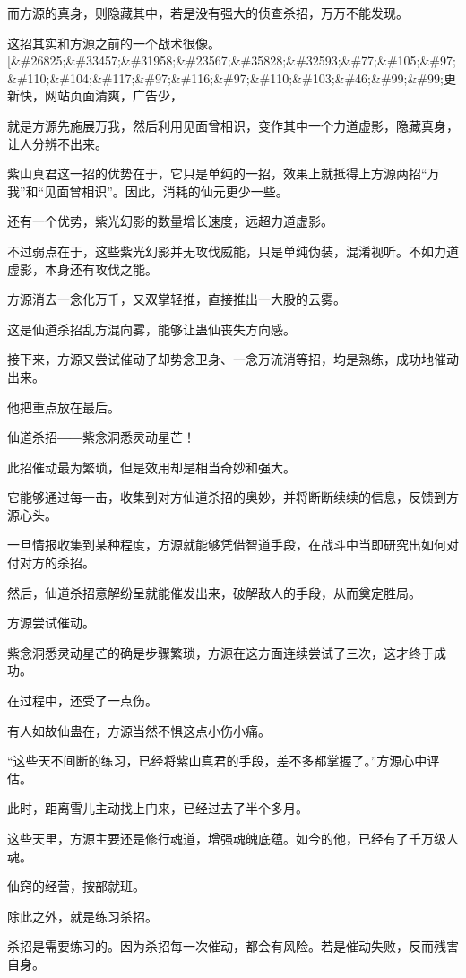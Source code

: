 \begin{this_body}
而方源的真身，则隐藏其中，若是没有强大的侦查杀招，万万不能发现。

这招其实和方源之前的一个战术很像。[\&\#26825;\&\#33457;\&\#31958;\&\#23567;\&\#35828;\&\#32593;\&\#77;\&\#105;\&\#97;\&\#110;\&\#104;\&\#117;\&\#97;\&\#116;\&\#97;\&\#110;\&\#103;\&\#46;\&\#99;\&\#99;更新快，网站页面清爽，广告少，

就是方源先施展万我，然后利用见面曾相识，变作其中一个力道虚影，隐藏真身，让人分辨不出来。

紫山真君这一招的优势在于，它只是单纯的一招，效果上就抵得上方源两招“万我”和“见面曾相识”。因此，消耗的仙元更少一些。

还有一个优势，紫光幻影的数量增长速度，远超力道虚影。

不过弱点在于，这些紫光幻影并无攻伐威能，只是单纯伪装，混淆视听。不如力道虚影，本身还有攻伐之能。

方源消去一念化万千，又双掌轻推，直接推出一大股的云雾。

这是仙道杀招乱方混向雾，能够让蛊仙丧失方向感。

接下来，方源又尝试催动了却势念卫身、一念万流消等招，均是熟练，成功地催动出来。

他把重点放在最后。

仙道杀招――紫念洞悉灵动星芒！

此招催动最为繁琐，但是效用却是相当奇妙和强大。

它能够通过每一击，收集到对方仙道杀招的奥妙，并将断断续续的信息，反馈到方源心头。

一旦情报收集到某种程度，方源就能够凭借智道手段，在战斗中当即研究出如何对付对方的杀招。

然后，仙道杀招意解纷呈就能催发出来，破解敌人的手段，从而奠定胜局。

方源尝试催动。

紫念洞悉灵动星芒的确是步骤繁琐，方源在这方面连续尝试了三次，这才终于成功。

在过程中，还受了一点伤。

有人如故仙蛊在，方源当然不惧这点小伤小痛。

“这些天不间断的练习，已经将紫山真君的手段，差不多都掌握了。”方源心中评估。

此时，距离雪儿主动找上门来，已经过去了半个多月。

这些天里，方源主要还是修行魂道，增强魂魄底蕴。如今的他，已经有了千万级人魂。

仙窍的经营，按部就班。

除此之外，就是练习杀招。

杀招是需要练习的。因为杀招每一次催动，都会有风险。若是催动失败，反而残害自身。


\end{this_body}
